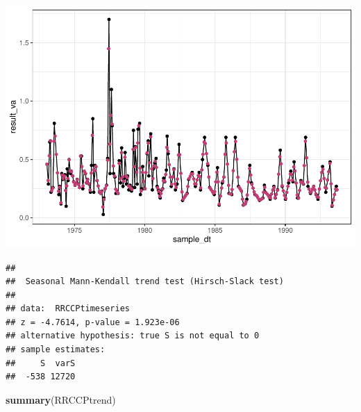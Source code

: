 \documentclass[12pt,]{article}
\newenvironment{Shaded}{\begin{snugshade}}{\end{snugshade}}
\newcommand{\CommentTok}[1]{\textcolor[rgb]{0.56,0.35,0.01}{\textit{#1}}}
\newcommand{\DataTypeTok}[1]{\textcolor[rgb]{0.13,0.29,0.53}{#1}}
\newcommand{\DecValTok}[1]{\textcolor[rgb]{0.00,0.00,0.81}{#1}}
\newcommand{\KeywordTok}[1]{\textcolor[rgb]{0.13,0.29,0.53}{\textbf{#1}}}
\newcommand{\NormalTok}[1]{#1}
\newcommand{\OperatorTok}[1]{\textcolor[rgb]{0.81,0.36,0.00}{\textbf{#1}}}
\newcommand{\StringTok}[1]{\textcolor[rgb]{0.31,0.60,0.02}{#1}}
\begin{document}
\includegraphics{Project_Template_files/figure-latex/unnamed-chunk-6-27.pdf}

\begin{Shaded}
\end{Shaded}

\begin{verbatim}
## 
##  Seasonal Mann-Kendall trend test (Hirsch-Slack test)
## 
## data:  RRCCPtimeseries
## z = -4.7614, p-value = 1.923e-06
## alternative hypothesis: true S is not equal to 0
## sample estimates:
##     S  varS 
##  -538 12720
\end{verbatim}

\begin{Shaded}
\begin{Highlighting}[]
\KeywordTok{summary}\NormalTok{(RRCCPtrend)}
\end{Highlighting}
\end{Shaded}
\end{document}
